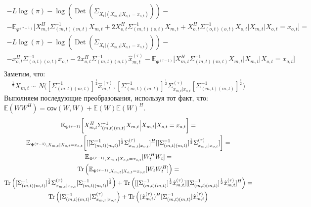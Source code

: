 \documentclass[11pt]{article}
\newcommand{\Expect}{\mathbb{E}}
\newcommand{\Cov}{\mathsf{cov}}
\DeclareMathOperator{\Det}{Det}
\begin{document}
\begin{equation*}
\begin{gathered}
-L \log(\pi) - \log (\Det(\Sigma_{X_t|(X_{m,t}|X_{o,t}=x_{o,t})}))  - \\ 
- \Expect_{\Psi^{(\tau-1)}}\bigg[X_{m,t}^H \Sigma_{(m,t)(m,t)}^{-1}X_{m,t} + 2 X_{o,t}^H \Sigma_{(m,t)(o,t)}^{-1}X_{m,t}  + X_{o,t}^H \Sigma_{(o,t)(o,t)}^{-1}X_{o,t}\Big|X_{m,t}|X_{o,t}=x_{o,t}\bigg] = \\
-L \log(\pi) - \log (\Det(\Sigma_{X_t|(X_{m,t}|X_{o,t}=x_{o,t})}))  - \\ 
- x_{o,t}^H \Sigma_{(o,t)(o,t)}^{-1}x_{o,t} - 2 x_{o,t}^H \Sigma_{(m,t)(o,t)}^{-1}\hat{x}_{m,t}^{(\tau)} - \Expect_{\Psi^{(\tau-1)}}\bigg[X_{m,t}^H \Sigma_{(m,t)(m,t)}^{-1}X_{m,t}   \Big|X_{m,t}|X_{o,t}=x_{o,t}\bigg] \\
\end{gathered}
\end{equation*}
Заметим, что: 
\begin{equation*}
[\Sigma_{(m,t)(m,t)}^{-1}]^{\frac{1}{2}}X_{m,t} \sim N\Big([\Sigma_{(m,t)(m,t)}^{-1}]^{\frac{1}{2}}\hat{x}_{m,t}^{(\tau)},[\Sigma_{(m,t)(m,t)}^{-1}]^{\frac{1}{2}}\Sigma^{(\tau)}_{x_{m,t}|x_{o,t}}[\Sigma_{(m,t)(m,t)}^{-1}]^{\frac{1}{2}}\Big)
\end{equation*}
Выполняем последующие преобразования, используя тот факт, что: $\Expect(WW^H)=\Cov(W,W)+\Expect(W)\Expect(W)^H$.
\begin{equation*}
\begin{gathered}
\Expect_{\Psi^{(\tau-1)}}\bigg[X_{m,t}^H \Sigma_{(m,t)(m,t)}^{-1}X_{m,t}   \Big|X_{m,t}|X_{o,t}=x_{o,t}\bigg] = \\
\Expect_{\Psi^{(\tau-1)},X_{m,t}|X_{o,t}=x_{o,t}}\bigg[[[\Sigma_{(m,t)(m,t)}^{-1}]^{\frac{1}{2}}\Sigma^{(\tau)}_{x_{m,t}|x_{o,t}}]^H[[\Sigma_{(m,t)(m,t)}^{-1}]^{\frac{1}{2}}\Sigma^{(\tau)}_{x_{m,t}|x_{o,t}}]\bigg] = \\
\Expect_{\Psi^{(\tau-1)},X_{m,t}|X_{o,t}=x_{o,t}}[W_t^HW_t] = \\
\Tr \Big( \Expect_{\Psi^{(\tau-1)},X_{m,t}|X_{o,t}=x_{o,t}}[W_tW_t^H] \Big) = \\
\Tr \Big( [\Sigma_{(m,t)(m,t)}^{-1}]^{\frac{1}{2}}\Sigma^{(\tau)}_{x_{m,t}|x_{o,t}}[\Sigma_{(m,t)(m,t)}^{-1}]^{\frac{1}{2}} \Big) +  \Tr \Big( [[\Sigma_{(m,t)(m,t)}^{-1}]^{\frac{1}{2}}\hat{x}_{m,t}^{(\tau)}][[\Sigma_{(m,t)(m,t)}^{-1}]^{\frac{1}{2}}\hat{x}_{m,t}^{(\tau)}]^H \Big)= \\
\Tr \Big( [\Sigma_{(m,t)(m,t)}^{-1}]\Sigma^{(\tau)}_{x_{m,t}|x_{o,t}} \Big) + \Tr \Big((\hat{x}_{m,t}^{(\tau)})^H[\Sigma_{(m,t)(m,t)}^{-1}]\hat{x}_{m,t}^{(\tau)} \Big) \\
\end{gathered}
\end{equation*}
\end{document}
